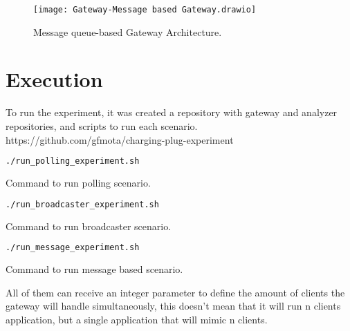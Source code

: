 \begin{figure}
    \centering
    \texttt{[image: Gateway-Message based Gateway.drawio]}
    \caption{Message queue-based Gateway Architecture.\label{fig:subfigures}}
\end{figure}

\section{Execution}
\label{sec:execution}

To run the experiment, it was created a repository with gateway and analyzer repositories, and scripts to run each scenario. https://github.com/gfmota/charging-plug-experiment

\begin{program}
    \centering
  
  \begin{lstlisting}[language=bash, style=wider]
    ./run_polling_experiment.sh
  \end{lstlisting}
  
    \caption{Command to run polling scenario.\label{prog:java}}
\end{program}

\begin{program}
    \centering
  
  \begin{lstlisting}[language=bash, style=wider]
    ./run_broadcaster_experiment.sh
  \end{lstlisting}
  
    \caption{Command to run broadcaster scenario.\label{prog:java}}
\end{program}

\begin{program}
    \centering
  
  \begin{lstlisting}[language=bash, style=wider]
    ./run_message_experiment.sh
  \end{lstlisting}
  
    \caption{Command to run message based scenario.\label{prog:java}}
\end{program}

All of them can receive an integer parameter to define the amount of clients the gateway will handle simultaneously, this doesn't mean that it will run n clients application, but a single application that will mimic n clients.

